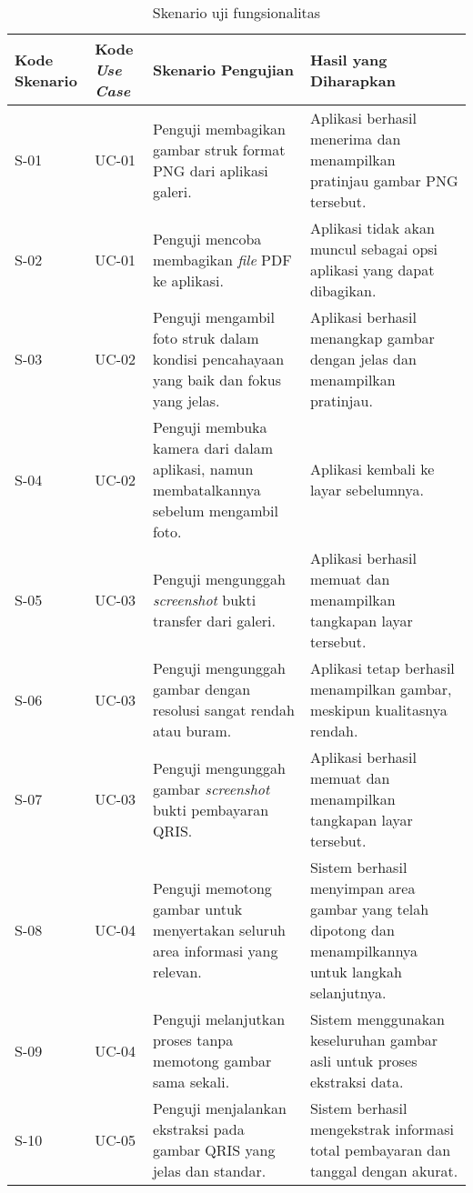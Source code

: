 \begin{table}[h!]
\caption{Skenario uji fungsionalitas}
\label{tab:skenario-uji-fungsional}
\begin{tabularx}{\linewidth}{|p{1.5cm}|p{1.5cm}|p{4.5cm}|X|}
\hline
\textbf{Kode Skenario} & \textbf{Kode \emph{Use Case}} & \textbf{Skenario Pengujian} & \textbf{Hasil yang Diharapkan} \\
\hline
S-01 & UC-01 & Penguji membagikan gambar struk format PNG dari aplikasi galeri. & Aplikasi berhasil menerima dan menampilkan pratinjau gambar PNG tersebut. \\
\hline
S-02 & UC-01 & Penguji mencoba membagikan \emph{file} PDF ke aplikasi. & Aplikasi tidak akan muncul sebagai opsi aplikasi yang dapat dibagikan. \\
\hline
S-03 & UC-02 & Penguji mengambil foto struk dalam kondisi pencahayaan yang baik dan fokus yang jelas. & Aplikasi berhasil menangkap gambar dengan jelas dan menampilkan pratinjau. \\
\hline
S-04 & UC-02 & Penguji membuka kamera dari dalam aplikasi, namun membatalkannya sebelum mengambil foto. & Aplikasi kembali ke layar sebelumnya. \\
\hline
S-05 & UC-03 & Penguji mengunggah \emph{screenshot} bukti transfer dari galeri. & Aplikasi berhasil memuat dan menampilkan tangkapan layar tersebut. \\
\hline
S-06 & UC-03 & Penguji mengunggah gambar dengan resolusi sangat rendah atau buram. & Aplikasi tetap berhasil menampilkan gambar, meskipun kualitasnya rendah. \\
\hline
S-07 & UC-03 & Penguji mengunggah gambar \emph{screenshot} bukti pembayaran QRIS. & Aplikasi berhasil memuat dan menampilkan tangkapan layar tersebut.\\
\hline
S-08 & UC-04 & Penguji memotong gambar untuk menyertakan seluruh area informasi yang relevan. & Sistem berhasil menyimpan area gambar yang telah dipotong dan menampilkannya untuk langkah selanjutnya. \\
\hline
S-09 & UC-04 & Penguji melanjutkan proses tanpa memotong gambar sama sekali. & Sistem menggunakan keseluruhan gambar asli untuk proses ekstraksi data. \\
\hline
S-10 & UC-05 & Penguji menjalankan ekstraksi pada gambar QRIS yang jelas dan standar. & Sistem berhasil mengekstrak informasi total pembayaran dan tanggal dengan akurat. \\
\hline
\end{tabularx}
\end{table}

